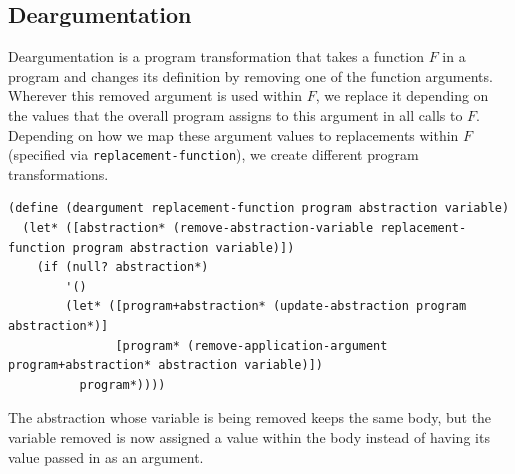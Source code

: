 \documentclass[a4paper,10pt]{article}
\begin{document}
\subsection{Deargumentation}
Deargumentation is a program transformation that takes a function $F$ in a program and changes its definition by removing one of the function arguments. Wherever this removed argument is used within $F$, we replace it depending on the values that the overall program assigns to this argument in all calls to $F$. Depending on how we map these argument values to replacements within $F$ (specified via \texttt{replacement-function}), we create different program transformations.

\begin{lstlisting}[frame=trbl]
(define (deargument replacement-function program abstraction variable)
  (let* ([abstraction* (remove-abstraction-variable replacement-function program abstraction variable)])
    (if (null? abstraction*)
        '()
        (let* ([program+abstraction* (update-abstraction program abstraction*)]
               [program* (remove-application-argument program+abstraction* abstraction variable)])
          program*))))
\end{lstlisting}
The abstraction whose variable is being removed keeps the same body, but the variable removed is now assigned a value within the body instead of having its value passed in as an argument.
\end{document}
